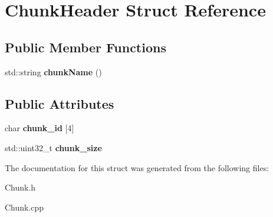 \hypertarget{structChunkHeader}{}\section{Chunk\+Header Struct Reference}
\label{structChunkHeader}
\subsection*{Public Member Functions}
\begin{DoxyCompactItemize}
\item 
\mbox{\label{structChunkHeader_a0eb3bf6e12db7e6e51139793af383832}} 
std\+::string {\bfseries chunk\+Name} ()
\end{DoxyCompactItemize}
\subsection*{Public Attributes}
\begin{DoxyCompactItemize}
\item 
\mbox{\label{structChunkHeader_afddbca24f7b26e9447d30c47a7bcecd6}} 
char {\bfseries chunk\+\_\+id} \mbox{[}4\mbox{]}
\item 
\mbox{\label{structChunkHeader_ab75ab35b3756606638da93d624c25d80}} 
std\+::uint32\+\_\+t {\bfseries chunk\+\_\+size}
\end{DoxyCompactItemize}


The documentation for this struct was generated from the following files\+:\begin{DoxyCompactItemize}
\item 
Chunk.\+h\item 
Chunk.\+cpp\end{DoxyCompactItemize}
